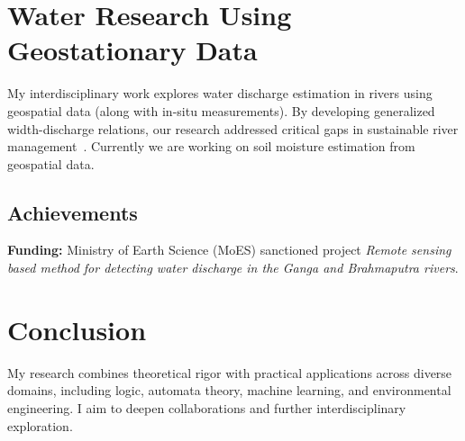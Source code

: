 \documentclass[11pt]{article}
\begin{document}
\section{Water Research Using Geostationary Data}
My interdisciplinary work explores water discharge estimation in rivers using geospatial data (along with in-situ measurements). By developing generalized width-discharge relations, our research addressed critical gaps in sustainable river management~\cite{esd21}. Currently we are working on soil moisture estimation from geospatial data.

\subsection{Achievements}
\textbf{Funding:} Ministry of Earth Science (MoES) sanctioned project \emph{Remote sensing based method
for detecting water discharge in the Ganga and Brahmaputra rivers}.

\section{Conclusion}
My research combines theoretical rigor with practical applications across diverse domains, including logic, automata theory, machine learning, and environmental engineering. I aim to deepen collaborations and further interdisciplinary exploration.



\end{document}
